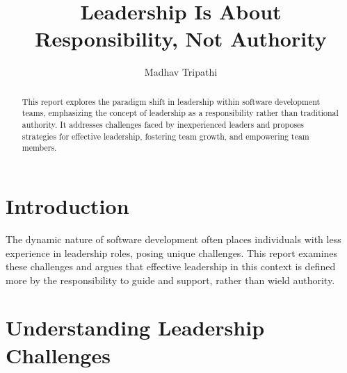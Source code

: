 \documentclass[runningheads]{llncs}
\begin{document}
%
\title{Leadership Is About Responsibility, Not Authority}
%
%
\author{
Madhav Tripathi
}
%
%
%
\maketitle              %
%
\begin{abstract}
This report explores the paradigm shift in leadership within software development teams, emphasizing the concept of leadership as a responsibility rather than traditional authority. It addresses challenges faced by inexperienced leaders and proposes strategies for effective leadership, fostering team growth, and empowering team members.


\end{abstract}
%
%
%

\section{Introduction}
The dynamic nature of software development often places individuals with less experience in leadership roles, posing unique challenges. This report examines these challenges and argues that effective leadership in this context is defined more by the responsibility to guide and support, rather than wield authority.

\section{Understanding Leadership Challenges}
\end{document}
